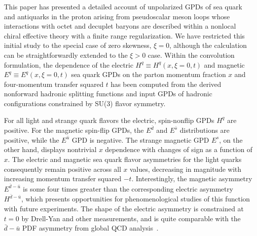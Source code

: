 \documentclass[preprintnumbers,prd,superscriptaddress,preprint]{revtex4-1}
\begin{document}
This paper has presented a detailed account of unpolarized GPDs of sea quark and antiquarks in the proton arising from pseudoscalar meson loops whose interactions with octet and decuplet baryons are described within a nonlocal chiral effective theory with a finite range regularization.
We have restricted this initial study to the special case of zero skewness, $\xi = 0$, although the calculation can be straightforwardly extended to the  $\xi > 0$ case.
Within the convolution formulation, the dependence of the electric $H^q \equiv H^q(x,\xi\!=\!0,t)$ and magnetic $E^q \equiv E^q(x,\xi\!=\!0,t)$ sea quark GPDs on the parton momentum fraction $x$ and four-momentum transfer squared $t$ has been computed from the derived nonforward hadronic splitting functions and input GPDs of hadronic configurations constrained by SU(3) flavor symmetry.
%
%


For all light and strange quark flavors the electric, spin-nonflip GPDs $H^q$ are positive.
For the magnetic spin-flip GPDs, the $E^{\bar{d}}$ and $E^{\bar{s}}$ distributions are positive, while the $E^{\bar{u}}$ GPD is negative.
The strange magnetic GPD $E^s$, on the other hand, displays nontrivial $x$ dependence with changes of sign as a function of $x$.
%
The electric and magnetic sea quark flavor asymmetries for the light quarks consequently remain positive across all $x$ values, decreasing in magnitude with increasing momentum transfer squared $-t$. 
Interestingly, the magnetic asymmetry $E^{\bar{d}-\bar{u}}$ is some four times greater than the corresponding electric asymmetry $H^{\bar{d}-\bar{u}}$, which presents opportunities for phenomenological studies of this function with future experiments.
The shape of the electric asymmetry is constrained at $t=0$ by Drell-Yan and other measurements, and is quite comparable with the $\bar d-\bar u$ PDF asymmetry from global QCD analysis~\cite{Cocuzza:2021cbi}.
\end{document}
